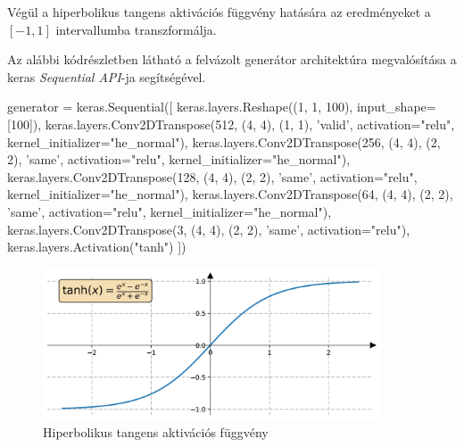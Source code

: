 Végül a hiperbolikus tangens aktivációs függvény hatására az eredményeket a $[-1, 1]$ intervallumba transzformálja.

Az alábbi kódrészletben látható a felvázolt generátor architektúra megvalósítása a keras \textit{Sequential API}-ja segítségével.

\begin{python}
generator = keras.Sequential([
    keras.layers.Reshape((1, 1, 100), input_shape=[100]),
    keras.layers.Conv2DTranspose(512, (4, 4), (1, 1), 'valid',
                                 activation="relu",
                                 kernel_initializer="he_normal"),
    keras.layers.Conv2DTranspose(256, (4, 4), (2, 2), 'same',
                                 activation="relu",
                                 kernel_initializer="he_normal"),
    keras.layers.Conv2DTranspose(128, (4, 4), (2, 2), 'same',
                                 activation="relu",
                                 kernel_initializer="he_normal"),
    keras.layers.Conv2DTranspose(64, (4, 4), (2, 2), 'same',
                                 activation="relu",
                                 kernel_initializer="he_normal"),
    keras.layers.Conv2DTranspose(3, (4, 4), (2, 2), 'same',
                                 activation="relu"),
    keras.layers.Activation("tanh")
])
\end{python}

\begin{figure}[h]
\centering
\includegraphics[width=10cm]{images/tanh.png}
\caption{Hiperbolikus tangens aktivációs függvény}
\label{fig:tanh}
\end{figure}



